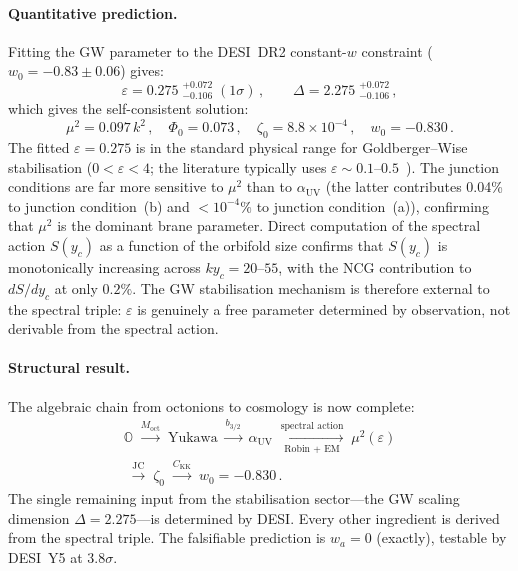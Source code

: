\paragraph{Quantitative prediction.}
Fitting the GW parameter to the DESI~DR2 constant-$w$ constraint ($w_0 = -0.83 \pm 0.06$) gives:
\begin{equation}
  \varepsilon = 0.275\; {}^{+0.072}_{-0.106}\; (1\sigma)\,,
  \qquad \Delta = 2.275\; {}^{+0.072}_{-0.106}\,,
  \label{eq:4-epsilon-desi}
\end{equation}
which gives the self-consistent solution:
\begin{equation}
  \boxed{
    \mu^2 = 0.097\, k^2\,,\quad
    \Phi_0 = 0.073\,,\quad
    \zeta_0 = 8.8 \times 10^{-4}\,,\quad
    w_0 = -0.830\,.
  }
  \label{eq:4-zeta0-prediction}
\end{equation}
The fitted $\varepsilon = 0.275$ is in the standard physical range for Goldberger--Wise stabilisation ($0 < \varepsilon < 4$; the literature typically uses $\varepsilon \sim 0.1$--$0.5$~\cite{ch4:GoldbergerWise1999}).  The junction conditions are far more sensitive to $\mu^2$ than to $\alpha_{\mathrm{UV}}$ (the latter contributes 0.04\% to junction condition~(b) and $< 10^{-4}\%$ to junction condition~(a)), confirming that $\mu^2$ is the dominant brane parameter.  Direct computation of the spectral action $S(y_c)$ as a function of the orbifold size confirms that $S(y_c)$ is monotonically increasing across $ky_c = 20$--$55$, with the NCG contribution to $dS/dy_c$ at only $0.2\%$.  The GW stabilisation mechanism is therefore external to the spectral triple: $\varepsilon$ is genuinely a free parameter determined by observation, not derivable from the spectral action.

\paragraph{Structural result.}
The algebraic chain from octonions to cosmology is now complete:
\begin{multline*}
  \mathbb{O} \;\xrightarrow{M_{\mathrm{oct}}}\; \text{Yukawa}
  \;\xrightarrow{b_{3/2}}\; \alpha_{\mathrm{UV}}
  \;\xrightarrow[\text{Robin + EM}]{\text{spectral action}}\; \mu^2(\varepsilon) \\
  \;\xrightarrow{\text{JC}}\; \zeta_0
  \;\xrightarrow{C_{\mathrm{KK}}}\; w_0 = -0.830\,.
\end{multline*}
The single remaining input from the stabilisation sector---the GW scaling dimension $\Delta = 2.275$---is determined by DESI.  Every other ingredient is derived from the spectral triple.  The falsifiable prediction is $w_a = 0$ (exactly), testable by DESI~Y5 at $3.8\sigma$.


